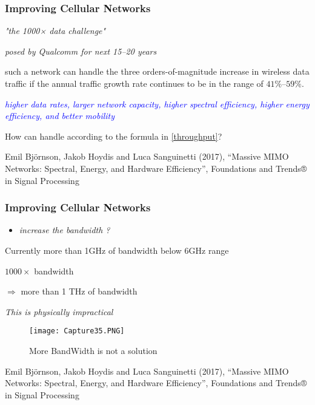 \documentclass{beamer}
\begin{document}




\begin{frame}[t,fragile=singleslide]\frametitle{Improving Cellular Networks}
\centerline{\textit{"the 1000× data challenge"}}
 
\centerline{\textit{posed by Qualcomm for next 15–20 years}}

\vspace{0.7cm}

such a network can handle the three orders-of-magnitude increase in wireless data traffic if the annual traffic growth rate continues to be in the range of $41\% – 59\%$.

\vspace{0.7cm}

\textcolor{blue}{\textit{higher data rates, larger network capacity, higher spectral efficiency, higher energy efficiency, and better mobility}}
\vspace{0.65cm}

How can handle according to the formula in \eqref{throughput}?

\vspace{1.2cm}

\tiny Emil Björnson, Jakob Hoydis and Luca Sanguinetti (2017), “Massive MIMO Networks: Spectral, Energy, and Hardware Efficiency”, Foundations and Trends® in Signal Processing

\end{frame}




\begin{frame}[fragile=singleslide]\frametitle{Improving Cellular Networks}
\begin{itemize}
\item \textit{increase the bandwidth ?}

\end{itemize}
Currently more than 1GHz of bandwidth below 6GHz range


\centerline{$1000\times$ bandwidth}


\centerline{$\Rightarrow$ more than 1 THz of bandwidth }

            
\centerline{      \emph{This is physically impractical}}

\begin{figure}
  \texttt{[image: Capture35.PNG]}
\caption{More BandWidth is not a solution} 
\end{figure}



\tiny Emil Björnson, Jakob Hoydis and Luca Sanguinetti (2017), “Massive MIMO Networks: Spectral, Energy, and Hardware Efficiency”, Foundations and Trends® in Signal Processing

\end{frame}
\end{document}
